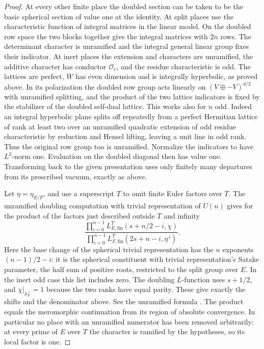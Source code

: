 \begin{proof}
At every other finite place the doubled section can be taken to
be the basic spherical section of value one at the identity.
At split places use the characteristic function of integral
matrices in the linear model. On the doubled row space the two
blocks together give the integral matrices with \(2n\) rows.
The determinant character is unramified and the integral general
linear group fixes their indicator. At inert places the extension
and characters are unramified, the additive character has conductor
\(\mathcal O_v\), and the residue characteristic is odd. The
lattices are perfect, \(W\) has even dimension and is integrally
hyperbolic, as proved above. In its polarization the doubled row
group acts linearly on \((V\oplus -V)^{d/2}\) with unramified
splitting, and the product of the two lattice indicators is
fixed by the stabilizer of the doubled self-dual lattice. This
works also for \(n\) odd. Indeed an integral hyperbolic plane
splits off repeatedly from a perfect Hermitian lattice of rank at
least two over an unramified quadratic extension of odd residue
characteristic by reduction and Hensel lifting, leaving a unit
line in odd rank. Thus the original row group too is unramified.
Normalize the indicators to have \(L^2\)-norm one. Evaluation on
the doubled diagonal then has value one. Transforming back to the
given presentation uses only finitely many departures from its
prescribed vacuum, exactly as above.

Let \(\eta=\eta_{E/F}\), and use a superscript \(T\) to omit finite
Euler factors over \(T\). The unramified doubling computation
with trivial representation of \(U(n)\) gives for the product of
the factors just described outside \(T\) and infinity
\[
 \frac{\displaystyle\prod_{i=0}^{n-1}
                 L^{T}_{E,\mathrm{fin}}(s+n/2-i,\chi)}
      {\displaystyle\prod_{i=0}^{n-1}
                 L^{T}_{F,\mathrm{fin}}(2s+n-i,\eta^{\,i})}.
\]
Here the base change of the spherical trivial representation has
the \(n\) exponents \((n-1)/2-i\): it is the spherical
constituent with trivial representation's Satake parameter,
the half sum of positive roots, restricted to the split group
over \(E\). In the inert odd case this list includes zero. The
doubling \(L\)-function uses \(s+1/2\), and \(\chi|_{\mathbb A_F^\times}=1\)
because the two ranks have equal parity. These give exactly the
shifts and the denominator above. See the unramified formula
\cite[\S4.2.1, (53)]{ehlsDoubling}. The product equals the
meromorphic continuation from its region of absolute convergence.
In particular no place with an unramified numerator has been
removed arbitrarily: at every prime of \(E\) over \(T\) the
character is ramified by the hypotheses, so its local factor is one.


\end{proof}
